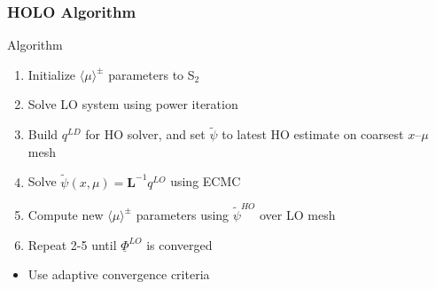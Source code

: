 \documentclass[xcolor=dvipsnames]{beamer}
\newlength{\wideitemsep}
\let\olditem\item
\renewcommand{\item}{\setlength{\itemsep}{\wideitemsep}\olditem}
\newcommand{\B}[1]{\ensuremath{\mathbf{#1}}}
\newcommand{\mom}[1]{\langle #1 \rangle}
\begin{document}
\begin{frame}
    \frametitle{HOLO Algorithm}
    {
    \begin{block}{Algorithm}
        \begin{enumerate}
            \item Initialize $\mom{\mu}^{\pm}$ parameters to S$_2$
            \item Solve LO system using power iteration
            \item Build $q^{LD}$ for HO solver, and set $\tilde{\psi}$ to latest
                HO estimate
                on coarsest $x$--$\mu$ mesh
            \item Solve $\tilde \psi(x,\mu) = \B L^{-1}q^{LO}$ using ECMC
            \item Compute new $\mom{\mu}^\pm$ parameters using $\tilde \psi^{HO}$ over LO mesh
            \item Repeat 2-5 until $\underline \Phi^{LO}$ is converged
        \end{enumerate}

    \begin{itemize}
        \item Use adaptive convergence criteria
    \end{itemize}
    \end{block}
}
\end{frame}
\end{document}
